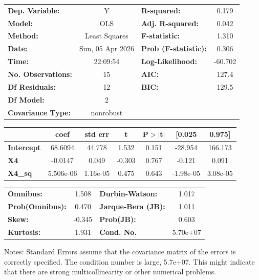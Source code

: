 \begin{center}
\begin{tabular}{lclc}
\toprule
\textbf{Dep. Variable:}    &        Y         & \textbf{  R-squared:         } &     0.179   \\
\textbf{Model:}            &       OLS        & \textbf{  Adj. R-squared:    } &     0.042   \\
\textbf{Method:}           &  Least Squares   & \textbf{  F-statistic:       } &     1.310   \\
\textbf{Date:}             & Sun, 05 Apr 2026 & \textbf{  Prob (F-statistic):} &    0.306    \\
\textbf{Time:}             &     22:09:54     & \textbf{  Log-Likelihood:    } &   -60.702   \\
\textbf{No. Observations:} &          15      & \textbf{  AIC:               } &     127.4   \\
\textbf{Df Residuals:}     &          12      & \textbf{  BIC:               } &     129.5   \\
\textbf{Df Model:}         &           2      & \textbf{                     } &             \\
\textbf{Covariance Type:}  &    nonrobust     & \textbf{                     } &             \\
\bottomrule
\end{tabular}
\begin{tabular}{lcccccc}
                   & \textbf{coef} & \textbf{std err} & \textbf{t} & \textbf{P$> |$t$|$} & \textbf{[0.025} & \textbf{0.975]}  \\
\midrule
\textbf{Intercept} &      68.6094  &       44.778     &     1.532  &         0.151        &      -28.954    &      166.173     \\
\textbf{X4}        &      -0.0147  &        0.049     &    -0.303  &         0.767        &       -0.121    &        0.091     \\
\textbf{X4\_sq}    &    5.506e-06  &     1.16e-05     &     0.475  &         0.643        &    -1.98e-05    &     3.08e-05     \\
\bottomrule
\end{tabular}
\begin{tabular}{lclc}
\textbf{Omnibus:}       &  1.508 & \textbf{  Durbin-Watson:     } &    1.017  \\
\textbf{Prob(Omnibus):} &  0.470 & \textbf{  Jarque-Bera (JB):  } &    1.011  \\
\textbf{Skew:}          & -0.345 & \textbf{  Prob(JB):          } &    0.603  \\
\textbf{Kurtosis:}      &  1.931 & \textbf{  Cond. No.          } & 5.70e+07  \\
\bottomrule
\end{tabular}
\end{center}

Notes: \newline
 [1] Standard Errors assume that the covariance matrix of the errors is correctly specified. \newline
 [2] The condition number is large, 5.7e+07. This might indicate that there are \newline
 strong multicollinearity or other numerical problems.